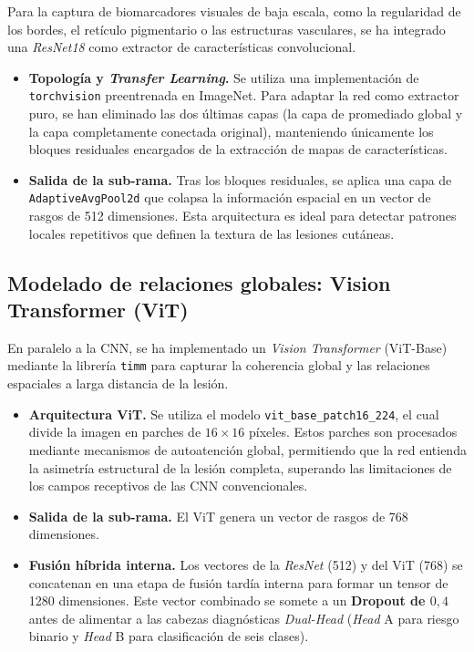 Para la captura de biomarcadores visuales de baja escala, como la regularidad de los bordes, el retículo pigmentario o las estructuras vasculares, se ha integrado una \textit{ResNet18} como extractor de características convolucional.



\begin{itemize}
	\item \textbf{Topología y \textit{Transfer Learning}.} Se utiliza una implementación de \texttt{torchvision} preentrenada en ImageNet. Para adaptar la red como extractor puro, se han eliminado las dos últimas capas (la capa de promediado global y la capa completamente conectada original), manteniendo únicamente los bloques residuales encargados de la extracción de mapas de características.
	
	\item \textbf{Salida de la sub-rama.} Tras los bloques residuales, se aplica una capa de \texttt{AdaptiveAvgPool2d} que colapsa la información espacial en un vector de rasgos de 512 dimensiones. Esta arquitectura es ideal para detectar patrones locales repetitivos que definen la textura de las lesiones cutáneas.
\end{itemize}

\subsection{Modelado de relaciones globales: Vision Transformer (ViT)}

En paralelo a la CNN, se ha implementado un \textit{Vision Transformer} (ViT-Base) mediante la librería \texttt{timm} para capturar la coherencia global y las relaciones espaciales a larga distancia de la lesión.



\begin{itemize}
	\item \textbf{Arquitectura ViT.} Se utiliza el modelo \texttt{vit\_base\_patch16\_224}, el cual divide la imagen en parches de $16 \times 16$ píxeles. Estos parches son procesados mediante mecanismos de autoatención global, permitiendo que la red entienda la asimetría estructural de la lesión completa, superando las limitaciones de los campos receptivos de las CNN convencionales.
	
	\item \textbf{Salida de la sub-rama.} El ViT genera un vector de rasgos de 768 dimensiones.
	
	\item \textbf{Fusión híbrida interna.} Los vectores de la \textit{ResNet} (512) y del ViT (768) se concatenan en una etapa de fusión tardía interna para formar un tensor de 1280 dimensiones. Este vector combinado se somete a un \textbf{Dropout de $0,4$} antes de alimentar a las cabezas diagnósticas \textit{Dual-Head} (\textit{Head} A para riesgo binario y \textit{Head} B para clasificación de seis clases).
\end{itemize}

